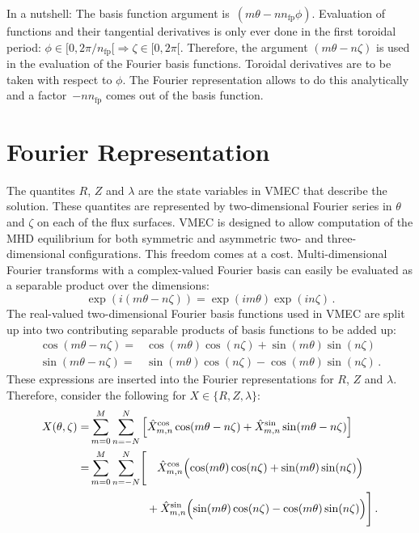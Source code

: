 In a nutshell:
The basis function argument is~$(m \theta - n n_\mathrm{fp} \phi)$.
Evaluation of functions and their tangential derivatives is only ever done in the first toroidal period:
$\phi \in [0, 2\pi/n_\mathrm{fp}[ \Rightarrow \zeta \in [0, 2\pi[$.
Therefore, the argument $(m \theta - n \zeta)$ is used in the evaluation of the Fourier basis functions.
Toroidal derivatives are to be taken with respect to $\phi$.
The Fourier representation allows to do this analytically and a factor~$-n n_\mathrm{fp}$ comes out of the basis function.

\FloatBarrier
\section{Fourier Representation} \label{sec:vmec_fourier_transforms}
The quantites $R$, $Z$ and $\lambda$ are the state variables in VMEC that describe the solution.
These quantites are represented by two-dimensional Fourier series in $\theta$ and $\zeta$ on each of the flux surfaces.
VMEC is designed to allow computation of the MHD equilibrium for both symmetric and asymmetric two- and three-dimensional configurations.
This freedom comes at a cost.
Multi-dimensional Fourier transforms with a complex-valued Fourier basis
can easily be evaluated as a separable product over the dimensions:
\begin{equation}
  \exp(i (m \theta - n \zeta)) = \exp(i m \theta) \exp(i n \zeta) \, .
\end{equation}
The real-valued two-dimensional Fourier basis functions used in VMEC
are split up into two contributing separable products of basis functions to be added up:
\begin{align}
  \cos(m \theta - n \zeta) =& \cos(m \theta) \cos(n \zeta) + \sin(m \theta) \sin(n \zeta) \\
  \sin(m \theta - n \zeta) =& \sin(m \theta) \cos(n \zeta) - \cos(m \theta) \sin(n \zeta) \, .
\end{align}
These expressions are inserted into the Fourier representations for $R$, $Z$ and $\lambda$.
Therefore, consider the following for $X \in \{R, Z, \lambda\}$:
\begin{align}
     X(\theta, \zeta)
  =&          \sum_{m=0}^M \sum_{n=-N}^N \left[   \hat{X}_{m,n}^\mathrm{cos} \cos(m \theta - n \zeta)
                                                + \hat{X}_{m,n}^\mathrm{sin} \sin(m \theta - n \zeta) \right] \nonumber \\
  =&          \sum_{m=0}^M \sum_{n=-N}^N \Biggl[ \phantom{+}\, \hat{X}_{m,n}^\mathrm{cos} \Bigl( \cos(m \theta) \cos(n \zeta) + \sin(m \theta) \sin(n \zeta) \Bigr) \nonumber \\
  ~& \phantom{\sum_{m=0}^M \sum_{n=-N}^N \Biggl[}\,       +    \hat{X}_{m,n}^\mathrm{sin} \Bigl( \sin(m \theta) \cos(n \zeta) - \cos(m \theta) \sin(n \zeta) \Bigr) \Biggr] \, .
\end{align}
